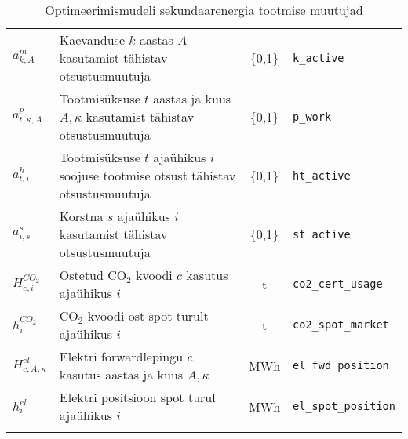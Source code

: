 \begin{landscape}
\begin{longtable}{l l c l}
$a^{m}_{k, A}$ & Kaevanduse $k$ aastas $A$ kasutamist tähistav otsustusmuutuja & \{0,1\} & \texttt{k\_active} \\
$a^{p}_{t,\kappa, A}$ & Tootmisüksuse $t$ aastas ja kuus $A, \kappa$ kasutamist tähistav otsustusmuutuja & \{0,1\} & \texttt{p\_work} \\

$a^{h}_{t, i}$ & Tootmisüksuse $t$ ajaühikus $i$ soojuse tootmise otsust tähistav otsustusmuutuja & \{0,1\} & \texttt{ht\_active} \\
$a^{s}_{i, s}$ & Korstna $s$ ajaühikus $i$ kasutamist tähistav otsustusmuutuja & \{0,1\} & \texttt{st\_active} \\

$H^{CO_2}_{c,i}$& Ostetud CO$_2$ kvoodi $c$ kasutus ajaühikus $i$ & t & \texttt{co2\_cert\_usage}\\
$h^{CO_2}_{i}$& CO$_2$ kvoodi ost spot turult ajaühikus $i$ & t & \texttt{co2\_spot\_market}\\
$H^{el}_{c,A,\kappa}$ &Elektri forwardlepingu $c$ kasutus aastas ja kuus $A,\kappa$ & MWh & \texttt{el\_fwd\_position}\\
$h^{el}_{i}$ &Elektri positsioon spot turul ajaühikus $i$ & MWh & \texttt{el\_spot\_position}\\

\caption{Optimeerimismudeli sekundaarenergia tootmise muutujad\label{tab:t_muutujad}}
\end{longtable}
\end{landscape}